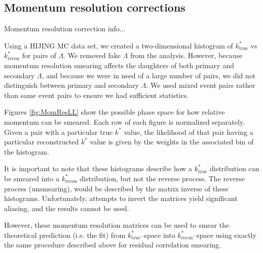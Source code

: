 \subsection{Momentum resolution corrections}
\label{sec:MomResCorrectFit}

Momentum resolution correction info...

Using a HIJING MC data set, we created a two-dimensional histogram of $k^*_\mathrm{true}$ vs $k^*_\mathrm{recon}$ for pairs of $\Lambda$.
We removed fake $\Lambda$ from the analysis.
However, because momentum resolution smearing affects the daughters of both primary and secondary $\Lambda$, and because we were in need of a large number of pairs, we did not distinguish between primary and secondary $\Lambda$.
We used mixed event pairs rather than same event pairs to ensure we had sufficient statistics.



Figures \ref{fig:MomResLL} show the possible phase space for how relative momentum can be smeared.
Each row of each figure is normalized separately.
Given a pair with a particular true $k^*$ value, the likelihood of that pair having a particular reconstructed $k^*$ value is given by the weights in the associated bin of the histogram.

It is important to note that these histograms describe how a $k^*_\mathrm{true}$ distribution can be smeared into a $k^*_\mathrm{recon}$ distribution, but not the reverse process.
The reverse process (unsmearing), would be described by the matrix inverse of these histograms.
Unfortunately, attempts to invert the matrices yield significant aliasing, and the results cannot be used.

However, these momentum resolution matrices can be used to smear the theoretical prediction (i.e. the fit) from $k^*_\mathrm{true}$--space into $k^*_\mathrm{recon}$--space using exactly the same procedure described above for residual correlation smearing.
